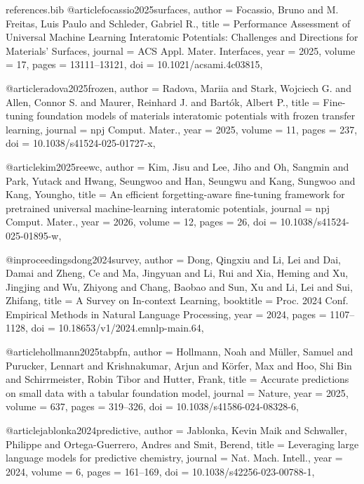 \begin{filecontents*}[overwrite]{references.bib}
@article{focassio2025surfaces,
  author = {Focassio, Bruno and M. Freitas, Luis Paulo and Schleder, Gabriel R.},
  title = {Performance Assessment of Universal Machine Learning Interatomic Potentials: Challenges and Directions for Materials’ Surfaces},
  journal = {ACS Appl. Mater. Interfaces},
  year = {2025},
  volume = {17},
  pages = {13111--13121},
  doi = {10.1021/acsami.4c03815},
}

@article{radova2025frozen,
  author = {Radova, Mariia and Stark, Wojciech G. and Allen, Connor S. and Maurer, Reinhard J. and Bartók, Albert P.},
  title = {Fine-tuning foundation models of materials interatomic potentials with frozen transfer learning},
  journal = {npj Comput. Mater.},
  year = {2025},
  volume = {11},
  pages = {237},
  doi = {10.1038/s41524-025-01727-x},
}

@article{kim2025reewc,
  author = {Kim, Jisu and Lee, Jiho and Oh, Sangmin and Park, Yutack and Hwang, Seungwoo and Han, Seungwu and Kang, Sungwoo and Kang, Youngho},
  title = {An efficient forgetting-aware fine-tuning framework for pretrained universal machine-learning interatomic potentials},
  journal = {npj Comput. Mater.},
  year = {2026},
  volume = {12},
  pages = {26},
  doi = {10.1038/s41524-025-01895-w},
}

@inproceedings{dong2024survey,
  author = {Dong, Qingxiu and Li, Lei and Dai, Damai and Zheng, Ce and Ma, Jingyuan and Li, Rui and Xia, Heming and Xu, Jingjing and Wu, Zhiyong and Chang, Baobao and Sun, Xu and Li, Lei and Sui, Zhifang},
  title = {A Survey on In-context Learning},
  booktitle = {Proc. 2024 Conf. Empirical Methods in Natural Language Processing},
  year = {2024},
  pages = {1107--1128},
  doi = {10.18653/v1/2024.emnlp-main.64},
}

@article{hollmann2025tabpfn,
  author = {Hollmann, Noah and Müller, Samuel and Purucker, Lennart and Krishnakumar, Arjun and Körfer, Max and Hoo, Shi Bin and Schirrmeister, Robin Tibor and Hutter, Frank},
  title = {Accurate predictions on small data with a tabular foundation model},
  journal = {Nature},
  year = {2025},
  volume = {637},
  pages = {319--326},
  doi = {10.1038/s41586-024-08328-6},
}

@article{jablonka2024predictive,
  author = {Jablonka, Kevin Maik and Schwaller, Philippe and Ortega-Guerrero, Andres and Smit, Berend},
  title = {Leveraging large language models for predictive chemistry},
  journal = {Nat. Mach. Intell.},
  year = {2024},
  volume = {6},
  pages = {161--169},
  doi = {10.1038/s42256-023-00788-1},
}


\end{filecontents*}

